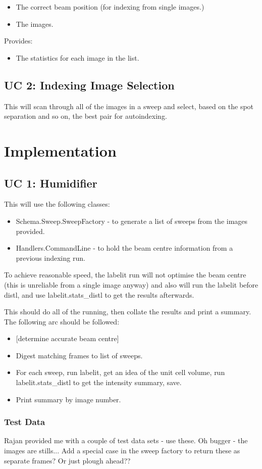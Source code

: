 \documentclass[a4paper, 11pt]{article}
\begin{document}
\begin{itemize}
\item{The correct beam position (for indexing from single images.)}
\item{The images.}
\end{itemize}

Provides:

\begin{itemize}
\item{The statistics for each image in the list.}
\end{itemize}

\subsection{UC 2: Indexing Image Selection}

This will scan through all of the images in a sweep and select, based on the
spot separation and so on, the best pair for autoindexing.

\section{Implementation}

\subsection{UC 1: Humidifier}

This will use the following classes:

\begin{itemize}
\item{Schema.Sweep.SweepFactory - to generate a list of sweeps from the 
images provided.}
\item{Handlers.CommandLine - to hold the beam centre information from a
previous indexing run.} 
\end{itemize}

To achieve reasonable speed, the labelit run will not optimise the beam
centre (this is unreliable from a single image anyway) and also will 
run the labelit before distl, and use labelit.stats\_distl to get the results
afterwards.

This should do all of the running, then collate the results and print a
summary. The following arc should be followed:

\begin{itemize}
\item{[determine accurate beam centre]}
\item{Digest matching frames to list of sweeps.}
\item{For each sweep, run labelit, get an idea of the unit cell volume,
run labelit.stats\_distl to get the intensity summary, save.}
\item{Print summary by image number.}
\end{itemize}

\subsubsection{Test Data}

Rajan provided me with a couple of test data sets - use these. Oh bugger - the 
images are stills... Add a special case in the sweep factory to return these 
as separate frames? Or just plough ahead??
\end{document}
